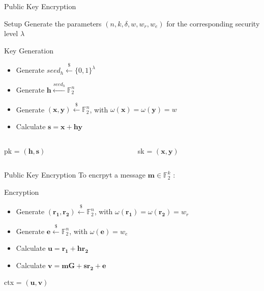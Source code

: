 \begin{frame}{Public Key Encryption}
    \begin{block}{Setup}
        Generate the parameters $(n, k, \delta, w, w_r, w_e)$ for the corresponding security level $\lambda$
    \end{block}
    \begin{block}{Key Generation}
        \begin{itemize}
            \item Generate $seed_h \xleftarrow{\$} \lbrace 0, 1 \rbrace^\lambda$
            \item Generate $\mathbf{h} \xleftarrow{seed_h} \mathds{F}_2^n$ 
            \item Generate $(\mathbf{x, y}) \xleftarrow{\$} \mathds{F}_2^n$, with $\omega(\mathbf{x}) = \omega({\mathbf{y}}) = w$
            \item Calculate $\mathbf{s = x + hy}$
        \end{itemize}
        \begin{columns}
            \begin{column}{0.45\linewidth}
                \begin{center}
                    \textsf{pk} = $(\mathbf{h, s})$
                \end{center}
            \end{column}
            \begin{column}{0.45\linewidth}
                \begin{center}
                    \textsf{sk} = $(\mathbf{x, y})$
                \end{center}
            \end{column}
        \end{columns}
    \end{block}
\end{frame}

\begin{frame}{Public Key Encryption}
    To encrpyt a message $\mathbf{m} \in \mathds{F}_2^k$ :
    \begin{block}{Encryption}
        \begin{itemize}
            \item Generate $(\mathbf{r_1, r_2}) \xleftarrow{\$} \mathds{F}_2^n$, with $\omega(\mathbf{r_1}) = \omega({\mathbf{r_2}}) = w_r$
            \item Generate $\mathbf{e} \xleftarrow{\$} \mathds{F}_2^n$, with $\omega(\mathbf{e}) = w_e$
            \item Calculate $\mathbf{u = r_1 + hr_2}$
            \item Calculate $\mathbf{v = mG +sr_2 + e}$
        \end{itemize}
        \begin{center}
            \textsf{ctx} = $(\mathbf{u, v})$
        \end{center}
    \end{block}
\end{frame}

